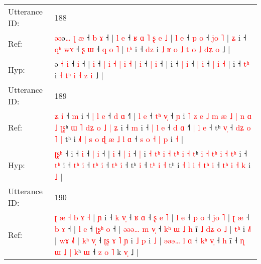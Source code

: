 \documentclass[10pt]{article}
\DeclareRobustCommand{\hl}[1]{{\textcolor{red}{#1}}}
\begin{document}
\begin{longtable}{ll}
 \\
\midrule
Utterance ID: & 188 \\
Ref: & \hl{ə}\hl{ə}ə\hl{…} \hl{ʈ} \hl{æ} ˧\hl{ }\hl{b} \hl{ɤ} ˧ |\hl{ }\hl{l} \hl{e} ˧ \hl{ʁ} \hl{ɑ} \hl{˥} \hl{ʂ} \hl{e} \hl{˩} |\hl{ }\hl{l} \hl{e} ˧ \hl{p} \hl{o} ˧\hl{ }\hl{j}\hl{o}\hl{ }\hl{˥} |\hl{ }\hl{ʑ} i ˧ \hl{q}\hl{ʰ} \hl{w}\hl{ɤ} ˧ \hl{ʂ} \hl{ɯ} ˧ \hl{q} \hl{o} \hl{˥} |\hl{ }\hl{t}\hl{ʰ} i ˧ \hl{d}\hl{z} i\hl{ }\hl{˩}\hl{ }\hl{ʁ} \hl{o} \hl{˩}\hl{ }\hl{t} \hl{o} \hl{˩} \hl{d}\hl{ʑ} \hl{o} ˩ |
 \\
Hyp: & \hl{}\hl{}ə\hl{} \hl{˧} \hl{i} ˧\hl{}\hl{} \hl{i} ˧ |\hl{}\hl{} \hl{i} ˧ \hl{|} \hl{i} \hl{˧} \hl{|} \hl{i} \hl{˧} |\hl{}\hl{} \hl{i} ˧ \hl{|} \hl{i} ˧\hl{}\hl{}\hl{}\hl{}\hl{} |\hl{}\hl{} i ˧ \hl{}\hl{|} \hl{}\hl{i} ˧ \hl{|} \hl{i} ˧ \hl{|} \hl{i} \hl{˧} |\hl{}\hl{}\hl{} i ˧ \hl{t}\hl{ʰ} i\hl{}\hl{}\hl{}\hl{} \hl{˧} \hl{}\hl{t}\hl{ʰ} \hl{i} \hl{˧} \hl{}\hl{z} \hl{i} ˩ |
 \\
\midrule
Utterance ID: & 189 \\
Ref: & \hl{ʑ}\hl{ }\hl{i} ˧\hl{ }\hl{m} i ˧\hl{ }\hl{|}\hl{ }\hl{l} \hl{e} ˧ \hl{d} \hl{ɑ} ˧\hl{˥} |\hl{ }\hl{l} \hl{e} ˧ \hl{t}\hl{ʰ} \hl{v}\hl{̩} ˧ \hl{ɲ} i\hl{ }\hl{˥}\hl{ }\hl{z} \hl{e} \hl{˩}\hl{ }\hl{m} \hl{æ} \hl{˩} \hl{|}\hl{ }\hl{n} \hl{ɑ} \hl{˩} \hl{ʈ}\hl{ʂ}ʰ \hl{ɯ} \hl{˥} \hl{d}\hl{ʑ} \hl{o} \hl{˩} \hl{|}\hl{ }\hl{ʑ} i ˧ \hl{}\hl{m} i ˧ \hl{|}\hl{ }\hl{l} \hl{e} ˧ \hl{}\hl{d} \hl{ɑ} ˧\hl{˥} \hl{|}\hl{ }\hl{l} \hl{e} ˧ tʰ \hl{v}\hl{̩} ˧ \hl{d}\hl{ʑ}\hl{ }\hl{o} \hl{˥} \hl{|} tʰ i\hl{ }\hl{˩}\hl{˥}\hl{ }\hl{|} \hl{s} \hl{o} \hl{ɖ} \hl{æ} \hl{˩}\hl{ }\hl{l} \hl{ɑ} ˧ \hl{s}\hl{ }\hl{o} \hl{˧} \hl{|} \hl{p} i \hl{˧} |
 \\
Hyp: & \hl{ʈ}\hl{ʂ}\hl{ʰ} ˧\hl{}\hl{} i ˧\hl{}\hl{}\hl{}\hl{} \hl{i} ˧ \hl{|} \hl{i} ˧\hl{} |\hl{}\hl{} \hl{i} ˧ \hl{}\hl{|} \hl{}\hl{i} ˧ \hl{|} i\hl{}\hl{}\hl{}\hl{} \hl{˧} \hl{}\hl{t}\hl{ʰ} \hl{i} \hl{˧} \hl{}\hl{t}\hl{ʰ} \hl{i} \hl{˧} \hl{}\hl{t}ʰ \hl{i} \hl{˧} \hl{t}\hl{ʰ} \hl{i} \hl{˧} \hl{}\hl{t}\hl{ʰ} i ˧ \hl{t}\hl{ʰ} i ˧ \hl{}\hl{t}\hl{ʰ} \hl{i} ˧ \hl{t}\hl{ʰ} \hl{i} ˧\hl{} \hl{}\hl{t}\hl{ʰ} \hl{i} ˧ tʰ \hl{}\hl{i} ˧ \hl{}\hl{}\hl{t}\hl{ʰ} \hl{i} \hl{˧} tʰ i\hl{}\hl{}\hl{}\hl{}\hl{} \hl{˧} \hl{l} \hl{i} \hl{˧} \hl{}\hl{t}\hl{ʰ} \hl{i} ˧ \hl{}\hl{t}\hl{ʰ} \hl{i} \hl{˧} \hl{k} i \hl{˩} |
 \\
\midrule
Utterance ID: & 190 \\
Ref: & \hl{ʈ}\hl{ }\hl{æ}\hl{ }\hl{˧} \hl{b} \hl{ɤ}\hl{ }\hl{˧} | \hl{ɲ} i ˧\hl{ }\hl{k} \hl{v}\hl{̩} ˧\hl{ }\hl{ʁ} \hl{ɑ} ˧ \hl{ʂ} \hl{e} \hl{˥} |\hl{ }\hl{l} \hl{e} ˧ \hl{p} \hl{o} ˧\hl{ }\hl{j}\hl{o}\hl{ }\hl{˥} |\hl{ }\hl{ʈ} \hl{æ} ˧ \hl{b} \hl{ɤ} ˧ |\hl{ }\hl{l} \hl{e} ˧ \hl{ʈ}\hl{ʂ}\hl{ʰ} \hl{o} ˧ |\hl{ }\hl{ə}\hl{ə}\hl{ə}\hl{…}\hl{ }\hl{m} \hl{v}\hl{̩} ˧ \hl{k}\hl{ʰ} \hl{ɯ} \hl{˩} \hl{h} i\hl{̃} \hl{˩} \hl{d}\hl{ʑ} \hl{o} \hl{˩} |\hl{ }\hl{t}\hl{ʰ} i \hl{˩}\hl{˥} | \hl{w}\hl{ɤ} \hl{˩}\hl{˥} |\hl{ }\hl{k}\hl{ʰ} \hl{v}\hl{̩} ˧ \hl{ʈ}\hl{ʂ} \hl{ɤ} \hl{˥} \hl{ɲ} i \hl{˩} \hl{p} i \hl{˩} | \hl{ə}\hl{ə}\hl{ə}\hl{…} \hl{l} \hl{ɑ} ˧ \hl{k}\hl{ʰ} \hl{v}\hl{̩} ˧ \hl{h} i\hl{̃} ˧\hl{ }\hl{ɳ} \hl{ɯ} \hl{˩} \hl{|} \hl{k}ʰ \hl{ɯ} ˧ \hl{}\hl{z} \hl{o} \hl{˥} k \hl{v}\hl{̩} ˩ |

\end{longtable}
\end{document}
